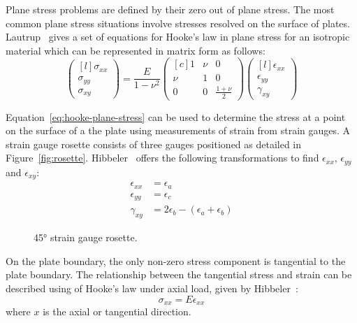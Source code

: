 \documentclass[a4paper,11pt,twocolumn]{article}
\begin{document}
{Plane stress problems are defined by their zero out of plane stress. The most 
common plane stress situations involve stresses resolved on the surface of 
plates. Lautrup~\cite[p.~129]{lautrup2004physics} gives a set of equations for
Hooke's law in plane stress for an isotropic material which can be represented
in matrix form as follows:
\begin{equation} \label{eq:hooke-plane-stress}
    \begin{pmatrix*}[l]
        \sigma_{xx} \\
        \sigma_{yy} \\
        \sigma_{xy}
    \end{pmatrix*}
    = \frac{E}{1-\nu^2}
    \begin{pmatrix*}[c]
        1   & \nu & 0 \\
        \nu & 1   & 0 \\
        0   & 0   & \frac{1+\nu}{2}
    \end{pmatrix*}
    \begin{pmatrix*}[l]
        \epsilon_{xx} \\
        \epsilon_{yy} \\
        \gamma_{xy}
    \end{pmatrix*}
\end{equation}

Equation~\eqref{eq:hooke-plane-stress} can be used to determine the stress at a 
point on the surface of a the plate using measurements of strain from strain 
gauges. A strain gauge rosette consists of three gauges positioned as detailed 
in Figure~\vref{fig:rosette}. Hibbeler~\cite[p.~512]{hibbeler2017mechanics} 
offers the following transformations to find $\epsilon_{xx}$, $\epsilon_{yy}$ 
and $\epsilon_{xy}$:
\begin{align}
    \label{eq:rosette-xx}
    \epsilon_{xx} &= \epsilon_a \\
    \label{eq:rosette-yy}
    \epsilon_{yy} &= \epsilon_c \\
    \label{eq:rosette-xy}
    \gamma_{xy}   &= 2\epsilon_b - (\epsilon_a + \epsilon_b)
\end{align}

\begin{figure}[h]
    \centering
    \def\svgwidth{0.48\textwidth}
    
    \caption{45\si{\degree} strain gauge rosette.}
    \label{fig:rosette}
\end{figure}

On the plate boundary, the only non-zero stress component is tangential to
the plate boundary. The relationship between the tangential stress and strain 
can be described using of Hooke's law under axial load, given by 
Hibbeler~\cite[p.~88]{hibbeler2017mechanics}:
\begin{equation} \label{eq:hooke-axial}
    \sigma_{xx} = E\epsilon_{xx}
\end{equation}
where $x$ is the axial or tangential direction.

}
\end{document}
